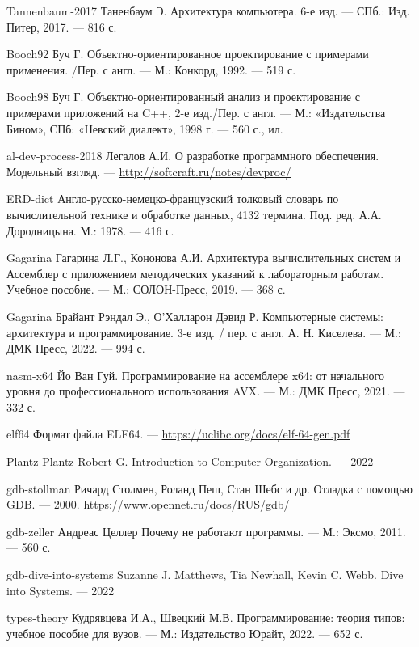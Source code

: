 \begin{thebibliography}{00}

\bibitem
{Tannenbaum-2017}
Таненбаум Э.
Архитектура компьютера. 6-е изд. 
--- СПб.: Изд. Питер, 2017. --- 816 с. 

\bibitem
{Booch92}
Буч Г.
Объектно-ориентированное проектирование с примерами применения. /Пер. с англ.
--- М.: Конкорд, 1992. --- 519 с.

\bibitem
{Booch98}
Буч Г.
Объектно-ориентированный анализ и проектирование с примерами приложений на C++, 2-е изд./Пер. с англ.
--- М.: «Издательства Бином», СПб: «Невский диалект», 1998 г. --- 560 с., ил.

\bibitem
{al-dev-process-2018}
Легалов А.И.
О разработке программного обеспечения. Модельный взгляд.
--- \url{http://softcraft.ru/notes/devproc/}

\bibitem
{ERD-dict}
Англо-русско-немецко-французский толковый словарь по вычислительной технике и обработке данных, 4132 термина.
Под. ред. А.А. Дородницына. М.: 1978. --- 416 с.

\bibitem
{Gagarina}
Гагарина Л.Г., Кононова А.И.
Архитектура вычислительных систем и Ассемблер с приложением методических указаний к лабораторным работам. Учебное пособие.
--- М.: СОЛОН-Пресс, 2019. --- 368 с.

\bibitem
{Gagarina}
Брайант Рэндал Э., О'Халларон Дэвид Р. 
Компьютерные системы: архитектура и программирование. 3-е изд. / пер. с англ. А. Н. Киселева.
--- М.: ДМК Пресс, 2022. --- 994 с.

\bibitem
{nasm-x64}
Йо Ван Гуй.
Программирование на ассемблере x64: от начального уровня до профессионального использования AVX. 
--- М.: ДМК Пресс, 2021. --- 332 с.

\bibitem
{elf64}
Формат файла ELF64.
--- \url{https://uclibc.org/docs/elf-64-gen.pdf}

\bibitem
{Plantz}
Plantz Robert G.
Introduction to Computer Organization.
--- 2022

\bibitem
{gdb-stollman}
Ричард Столмен, Роланд Пеш, Стан Шебс и др.
Отладка с помощью GDB.
--- 2000. \url{https://www.opennet.ru/docs/RUS/gdb/}

\bibitem
{gdb-zeller}
Андреас Целлер
Почему не работают программы.
--- М.: Эксмо, 2011. --- 560 с.

\bibitem
{gdb-dive-into-systems}
Suzanne J. Matthews, Tia Newhall, Kevin C. Webb.
Dive into Systems.
--- 2022

\bibitem
{types-theory}
Кудрявцева И.А., Швецкий М.В.
Программирование: теория типов: учебное пособие для вузов.
--- М.: Издательство Юрайт, 2022. --- 652 с.


\end{thebibliography}
